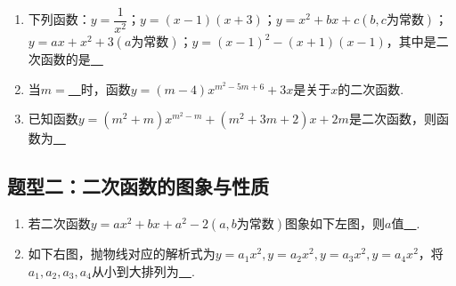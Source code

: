 \documentclass[10pt]{ctexart}
\begin{document}
\begin{jply}{}{}
   \begin{enumerate}[(1)]
   \item 下列函数：$y=\dfrac{1}{x^2}$；$y=(x-1)(x+3)$；$y=x^2+bx+c(b,c\text{为常数})$；$y=ax+x^2+3(a\text{为常数})$；$y=(x-1)^2-(x+1)(x-1)$，其中是二次函数的是\underline{~\hspace{2cm}~}
   \item 当$m=$\underline{~\hspace{2cm}~}时，函数$y=(m-4)x^{m^2-5m+6}+3x$是关于$x$的二次函数.
   \item 已知函数$y=(m^2+m)x^{m^2-m}+(m^2+3m+2)x+2m$是二次函数，则函数为\underline{~\hspace{2cm}~}
   \end{enumerate}
\end{jply}

\subsection{题型二：二次函数的图象与性质}
\begin{dkyi}{}{}
  \begin{enumerate}[(1)]
  \item 若二次函数$y=ax^2+bx+a^2-2(a,b\text{为常数})$图象如下左图，则$a$值\underline{~\hspace{2cm}~}.
  \item 如下右图，抛物线对应的解析式为$y=a_1x^2,y=a_2x^2,y=a_3x^2,y=a_4x^2$，将$a_1,a_2,a_3,a_4$从小到大排列为\underline{~\hspace{2cm}~}.
  \end{enumerate}
\end{dkyi}
\end{document}

